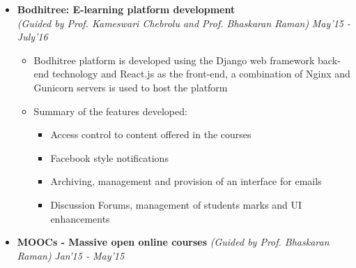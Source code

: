\begin{itemize}
\item \textbf{Bodhitree: E-learning platform development} \\
      \emph{(Guided by Prof. Kameswari Chebrolu and Prof. Bhaskaran Raman)} \hfill {\emph{May'15 - July'16}} \\[-0.6cm]
      \begin{itemize}
      	\item Bodhitree platform is developed using the Django web framework back-end technology and React.js as the front-end, a combination of Nginx  and Gunicorn servers is used to host the platform
      	\item Summary of the features developed:
      	\begin{itemize}
      		\item Access control to content offered in the courses
      		\item Facebook style notifications
      		\item Archiving, management and provision of an interface for emails
      		\item Discussion Forums, management of students marks and UI enhancements
      	\end{itemize}
      \end{itemize}

\item \textbf{MOOCs - Massive open online courses} \emph{(Guided by Prof. Bhaskaran Raman)} \hfill {\emph{Jan'15 - May'15}} \\[-0.5cm]

\end{itemize}